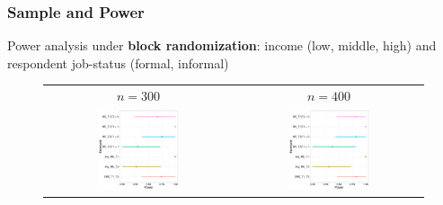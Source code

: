 \documentclass{beamer}\usepackage[]{graphicx}\usepackage[]{color}
\begin{document}
\begin{frame}\frametitle{Sample and Power}
Power analysis under \textbf{block randomization}: income (low, middle, high) and respondent job-status (formal, informal) 
    
\begin{figure}[htbp]
	\centering
\begin{table}
	\begin{tabular}{cc}
	$n=300$	& $n=400$  \\
	\includegraphics[width=0.45\textwidth]{power300_bra}	& \includegraphics[width=0.45\textwidth]{power400_bra}  \\
	\end{tabular}
\end{table}
\end{figure}
    
\end{frame}
\end{document}
